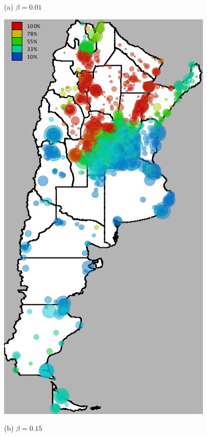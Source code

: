 \begin{figure}[h!]
\begin{minipage}{.495\linewidth}
		(a) $\beta = 0.01$
	\end{minipage}
	\begin{minipage}{.495\linewidth}
		\centering
		\includegraphics[width=0.90\linewidth]
		{figures/201112_hi_res_argentina_usuarios_proporcion_circulos_beta15/201112_hi_res_argentina_usuarios_proporcion_circulos_beta15}

		(b) $\beta = 0.15$
	\end{minipage}
\end{figure}

